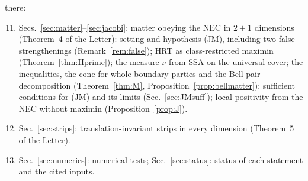 \documentclass[aps,prd,onecolumn,superscriptaddress,nofootinbib,amsmath,amssymb,11pt]{revtex4-2}
\theoremstyle{definition}
\begin{document}
there:
\begin{enumerate}
\setcounter{enumi}{10}
\item Secs.~\ref{sec:matter}--\ref{sec:jacobi}: matter obeying the NEC in $2+1$ dimensions (Theorem~4 of the Letter):
setting and hypothesis (JM), including two false strengthenings (Remark~\ref{rem:false}); HRT as class-restricted maximin
(Theorem~\ref{thm:Hprime}); the measure $\nu$ from SSA on the universal cover; the inequalities, the cone for whole-boundary
parties and the Bell-pair decomposition (Theorem~\ref{thm:M}, Proposition~\ref{prop:bellmatter}); sufficient conditions for (JM)
and its limits (Sec.~\ref{sec:JMsuff}); local positivity from the NEC without maximin (Proposition~\ref{prop:J}).
\item Sec.~\ref{sec:strips}: translation-invariant strips in every dimension (Theorem~5 of the Letter).
\item Sec.~\ref{sec:numerics}: numerical tests; Sec.~\ref{sec:status}: status of each statement and the cited
inputs.
\end{enumerate}
\end{document}
